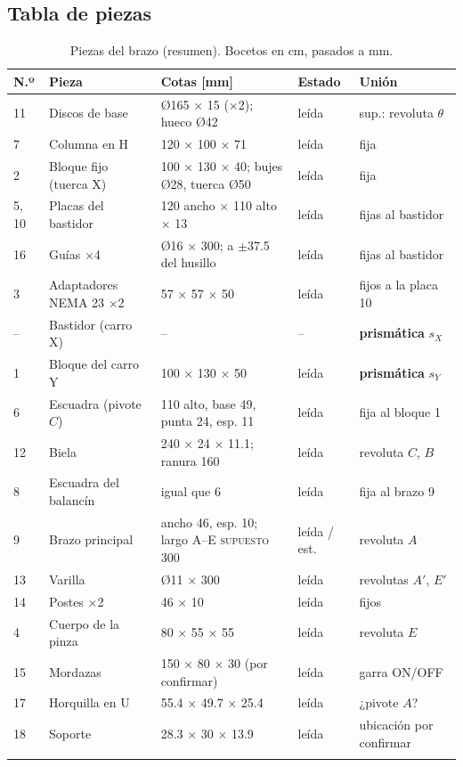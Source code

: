 \documentclass[a4paper,12pt]{article}
\newcommand{\supuesto}{\textcolor{naranja}{\textsc{supuesto}}}
\begin{document}
\subsection{Tabla de piezas}
\begin{longtable}{@{}p{0.6cm}p{3.6cm}p{5.2cm}p{2.0cm}p{2.6cm}@{}}
\toprule
\textbf{N.º} & \textbf{Pieza} & \textbf{Cotas [mm]} & \textbf{Estado} & \textbf{Unión}\\
\midrule\endhead
11 & Discos de base & Ø165 × 15 (×2); hueco Ø42 & leída & sup.: revoluta $\theta$\\
7 & Columna en H & 120 × 100 × 71 & leída & fija\\
2 & Bloque fijo (tuerca X) & 100 × 130 × 40; bujes Ø28, tuerca Ø50 & leída & fija\\
5, 10 & Placas del bastidor & 120 ancho × 110 alto × 13 & leída & fijas al bastidor\\
16 & Guías ×4 & Ø16 × 300; a $\pm$37.5 del husillo & leída & fijas al bastidor\\
3 & Adaptadores NEMA 23 ×2 & 57 × 57 × 50 & leída & fijos a la placa 10\\
-- & Bastidor (carro X) & -- & -- & \textbf{prismática} $s_X$\\
1 & Bloque del carro Y & 100 × 130 × 50 & leída & \textbf{prismática} $s_Y$\\
6 & Escuadra (pivote $C$) & 110 alto, base 49, punta 24, esp. 11 & leída & fija al bloque 1\\
12 & Biela & 240 × 24 × 11.1; ranura 160 & leída & revoluta $C$, $B$\\
8 & Escuadra del balancín & igual que 6 & leída & fija al brazo 9\\
9 & Brazo principal & ancho 46, esp. 10; largo A--E \supuesto{} 300 & leída / est. & revoluta $A$\\
13 & Varilla & Ø11 × 300 & leída & revolutas $A'$, $E'$\\
14 & Postes ×2 & 46 × 10 & leída & fijos\\
4 & Cuerpo de la pinza & 80 × 55 × 55 & leída & revoluta $E$\\
15 & Mordazas & 150 × 80 × 30 (por confirmar) & leída & garra ON/OFF\\
17 & Horquilla en U & 55.4 × 49.7 × 25.4 & leída & ¿pivote $A$?\\
18 & Soporte & 28.3 × 30 × 13.9 & leída & ubicación por confirmar\\
\bottomrule
\caption{Piezas del brazo (resumen). Bocetos en cm, pasados a mm.}
\end{longtable}
\end{document}
